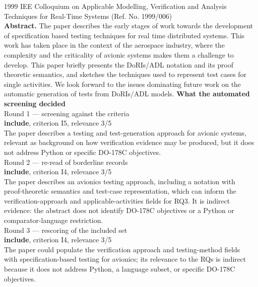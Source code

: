 \documentclass[11pt,a4paper]{article}
\begin{document}
{\color{soft}\small 1999 \textperiodcentered{} IEE Colloquium on Applicable Modelling, Verification and Analysis Techniques for Real-Time Systems (Ref. No. 1999/006)}\\[2mm]
{\small\textbf{Abstract.} The paper describes the early stages of work towards the development of specification based testing techniques for real time distributed systems. This work has taken place in the context of the aerospace industry, where the complexity and the criticality of avionic systems makes them a challenge to develop. This paper briefly presents the DoRIs/ADL notation and its proof theoretic semantics, and sketches the techniques used to represent test cases for single activities. We look forward to the issues dominating future work on the automatic generation of tests from DoRIs/ADL models.}
\vspace{3mm}
\vspace{2.5mm}
{\small\textbf{What the automated screening decided}}\\[2mm]
{\footnotesize\color{soft}Round 1 --- screening against the criteria}\\[0.5mm]
{\small\textbf{include}, criterion I5, relevance 3/5}\\[0.5mm]
{\small The paper describes a testing and test-generation approach for avionic systems, relevant as background on how verification evidence may be produced, but it does not address Python or specific DO-178C objectives.}\\[2.5mm]
{\footnotesize\color{soft}Round 2 --- re-read of borderline records}\\[0.5mm]
{\small\textbf{include}, criterion I4, relevance 3/5}\\[0.5mm]
{\small The paper describes an avionics testing approach, including a notation with proof-theoretic semantics and test-case representation, which can inform the verification-approach and applicable-activities fields for RQ3. It is indirect evidence: the abstract does not identify DO-178C objectives or a Python or comparator-language restriction.}\\[2.5mm]
{\footnotesize\color{soft}Round 3 --- rescoring of the included set}\\[0.5mm]
{\small\textbf{include}, criterion I4, relevance 3/5}\\[0.5mm]
{\small The paper could populate the verification approach and testing-method fields with specification-based testing for avionics; its relevance to the RQs is indirect because it does not address Python, a language subset, or specific DO-178C objectives.}\\[2.5mm]
\end{document}
